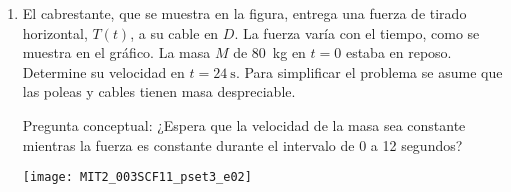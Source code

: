 \documentclass[11pt,spanish,a4paper]{article}
\begin{document}
\begin{enumerate}
\item
\begin{minipage}[t][6cm]{0.5\textwidth}
El cabrestante, que se muestra en la figura, entrega una fuerza de tirado horizontal, $T(t)$, a su cable en $D$.
La fuerza varía con el tiempo, como se muestra en el gráfico.
La masa \(M\) de \SI{80}{\kilo\gram} en \(t=0\) estaba en reposo.
Determine su velocidad en $t=\SI{24}{\second}$.
Para simplificar el problema se asume que las poleas y cables tienen masa despreciable.

Pregunta conceptual:
¿Espera que la velocidad de la masa sea constante mientras la fuerza es constante durante el intervalo de 0 a 12 segundos?\\
\end{minipage}
\begin{minipage}[c][0cm][t]{0.45\textwidth}
	\texttt{[image: MIT2\_003SCF11\_pset3\_e02]}
\end{minipage}




\end{enumerate}
\end{document}
